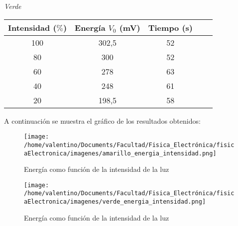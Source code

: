 \documentclass[a4paper]{article}
\begin{document}
          \begin{minipage}[c]{7.5cm}
            \vspace{5mm}
            \centering
            \textit{Verde} 
            \vspace{2mm}
          \end{minipage}

          \begin{tabular}{ c c c c c }
            \toprule
            Intensidad ($\%$) & Energía $V_{0}$ (mV) & Tiempo (s) \\
              \midrule
              100 & 302,5 &    52   \\
              80 & 300    &    52   \\
              60 & 278    &    63   \\
              40 & 248    &    61   \\
              20 & 198,5  &    58   \\
            \bottomrule
          \end{tabular}

        \indent A continuación se muestra el gráfico de los resultados obtenidos:
        \vspace{0mm}

        \begin{figure}[h]
          \centering
          \texttt{[image: /home/valentino/Documents/Facultad/Fisica\_Electrónica/fisicaElectronica/imagenes/amarillo\_energia\_intensidad.png]}
          \caption{\small Energía como función de la intensidad de la luz}
        \end{figure}

        \begin{figure}[h]
          \centering
          \texttt{[image: /home/valentino/Documents/Facultad/Fisica\_Electrónica/fisicaElectronica/imagenes/verde\_energia\_intensidad.png]}
          \caption{\small Energía como función de la intensidad de la luz}
        \end{figure}
        
        \newpage
        \noindent
        \thispagestyle{fancy}
        
        
\end{document}

